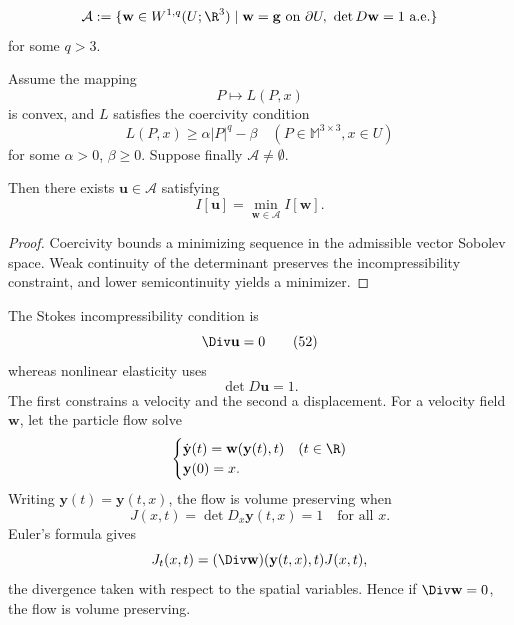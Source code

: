 \begin{definition}
\label{def:admissible-class-incompressible-elasticity}
\[
\mathcal{A} := \{\mathbf{w} \in W^{1,q}(U; \R^3) \mid \mathbf{w} = \mathbf{g} \text{ on } \partial U,\ \det D\mathbf{w} = 1 \text{ a.e.}\}
\]
for some $q > 3$.
\end{definition}

\begin{theorem}
\label{thm:existence-minimizer-determinant-constraint}
Assume the mapping
\[
P \mapsto L(P,x)
\]
is convex, and $L$ satisfies the coercivity condition
\[
L(P,x) \geq \alpha|P|^q - \beta \quad (P \in \mathbb{M}^{3 \times 3}, x \in U)
\]
for some $\alpha > 0$, $\beta \geq 0$. Suppose finally $\mathcal{A} \neq \emptyset$.

Then there exists $\mathbf{u} \in \mathcal{A}$ satisfying
\[
I[\mathbf{u}] = \min_{\mathbf{w} \in \mathcal{A}} I[\mathbf{w}].
\]
\end{theorem}

\begin{proof}
\sketch Coercivity bounds a minimizing sequence in the admissible vector Sobolev space. Weak continuity of the determinant preserves the incompressibility constraint, and lower semicontinuity yields a minimizer.
\end{proof}

\begin{remark}
\label{rem:incompressibility-euler-formula}
The Stokes incompressibility condition is
\[
\Div \mathbf{u} = 0
\tag{52}
\]
whereas nonlinear elasticity uses
\[
\det D\mathbf{u} = 1.
\tag{53}
\]
The first constrains a velocity and the second a displacement. For a velocity field $\mathbf w$, let the particle flow solve
\[
\begin{cases}
\dot{\mathbf{y}}(t) = \mathbf{w}(\mathbf{y}(t), t) & (t \in \R) \\
\mathbf{y}(0) = x.
\end{cases}
\]
Writing $\mathbf y(t)=\mathbf y(t,x)$, the flow is volume preserving when
\[
J(x, t) = \det D_x \mathbf{y}(t, x) = 1 \quad \text{for all } x.
\]
Euler's formula gives
\[
J_t(x, t) = (\Div \mathbf{w})(\mathbf{y}(t, x), t)J(x, t),
\]
the divergence taken with respect to the spatial variables. Hence if $\Div \mathbf{w} = 0$, the flow is volume preserving.
\end{remark}

